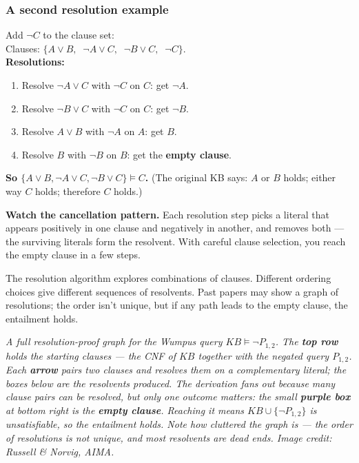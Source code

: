\documentclass[11pt, a4paper]{article}
\begin{document}
\subsubsection*{A second resolution example}

\begin{exbox}
Add $\neg C$ to the clause set:\\[0.3em]
Clauses: $\{A \lor B, \;\; \neg A \lor C, \;\; \neg B \lor C, \;\; \neg C\}$.\\[0.3em]
\textbf{Resolutions:}
\begin{enumerate}[itemsep=0pt, topsep=0pt]
  \item Resolve $\neg A \lor C$ with $\neg C$ on $C$: get $\neg A$.
  \item Resolve $\neg B \lor C$ with $\neg C$ on $C$: get $\neg B$.
  \item Resolve $A \lor B$ with $\neg A$ on $A$: get $B$.
  \item Resolve $B$ with $\neg B$ on $B$: get the \textbf{empty clause}.
\end{enumerate}
\textbf{So $\{A \lor B, \neg A \lor C, \neg B \lor C\} \models C$.} (The original KB says: $A$ or $B$ holds; either way $C$ holds; therefore $C$ holds.)
\end{exbox}

\textbf{Watch the cancellation pattern.} Each resolution step picks a literal that appears positively in one clause and negatively in another, and removes both — the surviving literals form the resolvent. With careful clause selection, you reach the empty clause in a few steps.

\begin{notebox}
The resolution algorithm explores combinations of clauses. Different ordering choices give different sequences of resolvents. Past papers may show a graph of resolutions; the order isn't unique, but if any path leads to the empty clause, the entailment holds.
\end{notebox}

\begin{center}

\footnotesize\textit{A full resolution-proof graph for the Wumpus query $KB \models \neg P_{1,2}$. The \textbf{top row} holds the starting clauses — the CNF of $KB$ together with the negated query $P_{1,2}$. Each \textbf{arrow} pairs two clauses and resolves them on a complementary literal; the boxes below are the resolvents produced. The derivation fans out because many clause pairs can be resolved, but only one outcome matters: the small \textbf{purple box} at bottom right is the \textbf{empty clause}. Reaching it means $KB \cup \{\neg P_{1,2}\}$ is unsatisfiable, so the entailment holds. Note how cluttered the graph is — the order of resolutions is not unique, and most resolvents are dead ends. Image credit: Russell \& Norvig, AIMA.}
\end{center}
\end{document}
